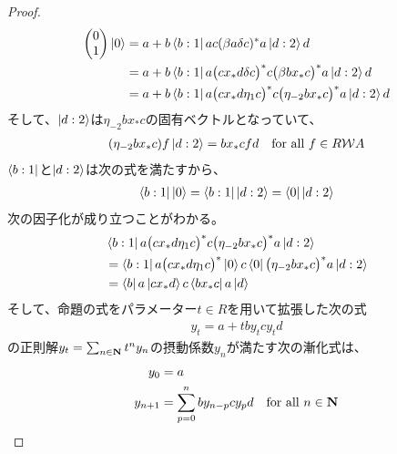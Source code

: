 {\begin{proof}
\begin{equation*}
\begin{split}
\begin{pmatrix}
				0 \\ 1
			\end{pmatrix}\mathinner{|{0}\rangle} &= a + b\mathinner{\langle{b:1}|}ac(\beta a\delta c)^*a\mathinner{|{d:2}\rangle}d \\
			&= a + b\mathinner{\langle{b:1}|}a\bigl(cx_*d\delta c\bigr)^*
				c\bigl(\beta bx_*c\bigr)^*a\mathinner{|{d:2}\rangle}d \\
			&= a + b\mathinner{\langle{b:1}|}a\bigl(cx_*d\eta_1 c\bigr)^*
				c\bigl(\eta_{-2} bx_*c\bigr)^*a\mathinner{|{d:2}\rangle}d \\
		\end{split}\end{equation*}
		そして、$\mathinner{|{d:2}\rangle}$は$\eta_{-2} bx_*c$の固有ベクトルとなっていて、
		\begin{equation*}\begin{split}
			(\eta_{-2} bx_*c)f\mathinner{|{d:2}\rangle} = bx_*cfd \quad\text{for all } f\in R{{\mathcal{W}}} A
		\end{split}\end{equation*}
		$\mathinner{\langle{b:1}|}$と$\mathinner{|{d:2}\rangle}$は次の式を満たすから、
		\begin{equation*}\begin{split}
			\mathinner{\langle{b:1}|}\mathinner{|{0}\rangle} = \mathinner{\langle{b:1}|}\mathinner{|{d:2}\rangle} = \mathinner{\langle{0}|}\mathinner{|{d:2}\rangle}
		\end{split}\end{equation*}
		次の因子化が成り立つことがわかる。
		\begin{equation*}\begin{split}
			&\mathinner{\langle{b:1}|}a\bigl(cx_*d\eta_1 c\bigr)^*
				c\bigl(\eta_{-2} bx_*c\bigr)^*a\mathinner{|{d:2}\rangle} \\
			&= \mathinner{\langle{b:1}|}a\bigl(cx_*d\eta_1 c\bigr)^*\mathinner{|{0}\rangle}
				c\mathinner{\langle{0}|}\bigl(\eta_{-2} bx_*c\bigr)^*a\mathinner{|{d:2}\rangle} \\
			&= \mathinner{\langle{b}|}a\mathinner{|{cx_*d}\rangle}c\mathinner{\langle{bx_*c}|}a\mathinner{|{d}\rangle} \\
		\end{split}\end{equation*}
		そして、命題の式をパラメーター$t\in R$を用いて拡張した次の式
		\begin{equation*}\begin{split}
			y_t = a + tby_tcy_td
		\end{split}\end{equation*}
		の正則解$y_t=\sum_{n\in\mathbf{N}}t^ny_n$の摂動係数$y_n$が満たす次の漸化式は、
		\begin{equation*}\begin{split}
			y_0 &= a \\
			y_{n+1} &= \sum_{p=0}^n by_{n-p}cy_pd \quad\text{for all } n\in\mathbf{N}
		\end{split}\end{equation*}

\end{proof}}
